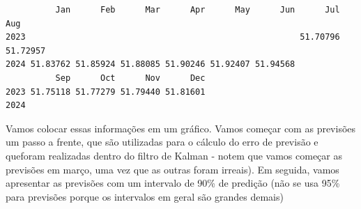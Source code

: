 \documentclass[
  letterpaper,
  DIV=11,
  numbers=noendperiod]{scrreprt}
\newenvironment{Shaded}{\begin{snugshade}}{\end{snugshade}}
\newcommand{\DecValTok}[1]{\textcolor[rgb]{0.68,0.00,0.00}{#1}}
\newcommand{\FunctionTok}[1]{\textcolor[rgb]{0.28,0.35,0.67}{#1}}
\newcommand{\NormalTok}[1]{\textcolor[rgb]{0.00,0.23,0.31}{#1}}
\newcommand{\OtherTok}[1]{\textcolor[rgb]{0.00,0.23,0.31}{#1}}
\newcommand{\SpecialCharTok}[1]{\textcolor[rgb]{0.37,0.37,0.37}{#1}}
\begin{document}
\begin{Shaded}
\end{Shaded}

\begin{verbatim}
          Jan      Feb      Mar      Apr      May      Jun      Jul      Aug
2023                                                       51.70796 51.72957
2024 51.83762 51.85924 51.88085 51.90246 51.92407 51.94568                  
          Sep      Oct      Nov      Dec
2023 51.75118 51.77279 51.79440 51.81601
2024                                    
\end{verbatim}

Vamos colocar essas informações em um gráfico. Vamos começar com as
previsões um passo a frente, que são utilizadas para o cálculo do erro
de previsão e queforam realizadas dentro do filtro de Kalman - notem que
vamos começar as previsões em março, uma vez que as outras foram
irreais). Em seguida, vamos apresentar as previsões com um intervalo de
90\% de predição (não se usa 95\% para previsões porque os intervalos em
geral são grandes demais)
\end{document}
